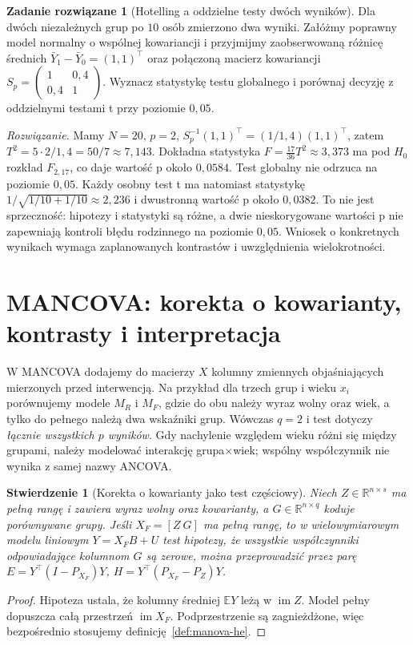 \documentclass[11pt,a4paper,oneside]{report}
\numberwithin{equation}{chapter}
\theoremstyle{plain}
\newtheorem{stwierdzenie}[twierdzenie]{Stwierdzenie}
\theoremstyle{definition}
\newtheorem{zadanie}{Zadanie rozwiązane}[chapter]
\theoremstyle{remark}
\newcommand{\R}{\mathbb R}
\newcommand{\E}{\mathbb E}
\begin{document}
\begin{zadanie}[Hotelling a oddzielne testy dwóch wyników]
Dla dwóch niezależnych grup po $10$ osób zmierzono dwa wyniki. Załóżmy poprawny model normalny o wspólnej kowariancji i przyjmijmy zaobserwowaną różnicę średnich $\bar Y_1-\bar Y_0=(1,1)^\top$ oraz połączoną macierz kowariancji
$S_p=\begin{pmatrix}1&0{,}4\\0{,}4&1\end{pmatrix}$.
Wyznacz statystykę testu globalnego i porównaj decyzję z oddzielnymi testami t przy poziomie $0{,}05$.\par
\emph{Rozwiązanie.} Mamy $N=20$, $p=2$, $S_p^{-1}(1,1)^\top=(1/1{,}4)(1,1)^\top$, zatem $T^2=5\cdot 2/1{,}4=50/7\approx7{,}143$. Dokładna statystyka $F=\frac{17}{36}T^2\approx3{,}373$ ma pod $H_0$ rozkład $F_{2,17}$, co daje wartość p około $0{,}0584$. Test globalny nie odrzuca na poziomie $0{,}05$. Każdy osobny test t ma natomiast statystykę $1/\sqrt{1/10+1/10}\approx2{,}236$ i dwustronną wartość p około $0{,}0382$. To nie jest sprzeczność: hipotezy i statystyki są różne, a dwie nieskorygowane wartości p nie zapewniają kontroli błędu rodzinnego na poziomie $0{,}05$. Wniosek o konkretnych wynikach wymaga zaplanowanych kontrastów i uwzględnienia wielokrotności.
\end{zadanie}

\section{MANCOVA: korekta o kowarianty, kontrasty i interpretacja}
W MANCOVA dodajemy do macierzy $X$ kolumny zmiennych objaśniających mierzonych przed interwencją. Na przykład dla trzech grup i wieku $x_i$ porównujemy modele $M_R$ i $M_F$, gdzie do obu należy wyraz wolny oraz wiek, a tylko do pełnego należą dwa wskaźniki grup. Wówczas $q=2$ i test dotyczy \emph{łącznie wszystkich $p$ wyników}. Gdy nachylenie względem wieku różni się między grupami, należy modelować interakcję grupa$\times$wiek; wspólny współczynnik nie wynika z samej nazwy ANCOVA.

\begin{stwierdzenie}[Korekta o kowarianty jako test częściowy]\label{prop:mancova-adjusted}
Niech $Z\in\R^{n\times s}$ ma pełną rangę i zawiera wyraz wolny oraz kowarianty, a $G\in\R^{n\times q}$ koduje porównywane grupy. Jeśli $X_F=[Z\ G]$ ma pełną rangę, to w wielowymiarowym modelu liniowym $Y=X_FB+U$ test hipotezy, że wszystkie współczynniki odpowiadające kolumnom $G$ są zerowe, można przeprowadzić przez parę
$E=Y^\top(I-P_{X_F})Y$, $H=Y^\top(P_{X_F}-P_Z)Y$.
\end{stwierdzenie}
\begin{proof}
Hipoteza ustala, że kolumny średniej $\E Y$ leżą w $\operatorname{im}Z$. Model pełny dopuszcza całą przestrzeń $\operatorname{im}X_F$. Podprzestrzenie są zagnieżdżone, więc bezpośrednio stosujemy definicję~\ref{def:manova-he}.
\end{proof}
\end{document}
